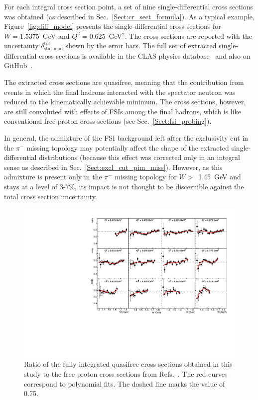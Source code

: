 \documentclass[prc,twocolumn,superscriptaddress,showpacs,amssymb,amsmath,amsfonts,aps,nofootinbib]{revtex4-1}
\begin{document}
For each integral cross section point, a set of nine single-differential cross sections was obtained (as described in Sec.\!~\ref{Sect:cr_sect_formula}). As a typical example, Figure~\ref{fig:diff_model} presents the single-differential cross sections for $W= 1.5375$~GeV and $Q^{2}= 0.625$~GeV$^{2}$. The cross sections are reported with the uncertainty $\delta_{\text{stat,mod}}^{\text{tot}}$ shown by the error bars. The full set of extracted single-differential cross sections is available in the CLAS physics database~\cite{CLAS_DB} and also on GitHub~\cite{Github:data}.


The extracted cross sections are quasifree, meaning that the contribution from events in which the final hadrons interacted with the spectator neutron was reduced to the kinematically achievable minimum. The cross sections, however, are still convoluted with effects of FSIs among the final hadrons, which is like conventional free proton cross sections (see Sec.\!~\ref{Sect:fsi_probing}). 


In general, the admixture of the FSI background left after the exclusivity cut in the $\pi^{-}$ missing topology may potentially affect the shape of the extracted single-differential distributions (because this effect was corrected only in an integral sense as described in Sec.\!~\ref{Sect:excl_cut_pim_miss}). However, as this admixture is present only in the $\pi^{-}$ missing topology for $W>$~1.45~GeV and stays at a level of 3-7\%, its impact is not thought to be discernible against the total cross section uncertainty.


\begin{figure}[htp]
\begin{center}
\includegraphics[width=16.25cm]{pictures/fed_comp/with_fed_w2.pdf}
\caption{\small Ratio of the fully integrated quasifree cross sections obtained in this study to the free proton cross sections from Refs.\!~\cite{Fed_an_note:2017,Fed_paper_2018}. The red curves correspond to polynomial fits. The dashed line marks the value of 0.75. } \label{fig:fed_w}
\end{center}
\end{figure}
\end{document}
